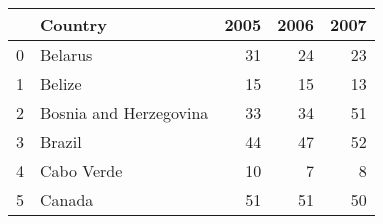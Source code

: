 \begin{tabular}{llrrr}
\toprule
 & Country & 2005 & 2006 & 2007 \\
\midrule
0 & Belarus & 31 & 24 & 23 \\
1 & Belize & 15 & 15 & 13 \\
2 & Bosnia and Herzegovina & 33 & 34 & 51 \\
3 & Brazil & 44 & 47 & 52 \\
4 & Cabo Verde & 10 & 7 & 8 \\
5 & Canada & 51 & 51 & 50 \\
\bottomrule
\end{tabular}
